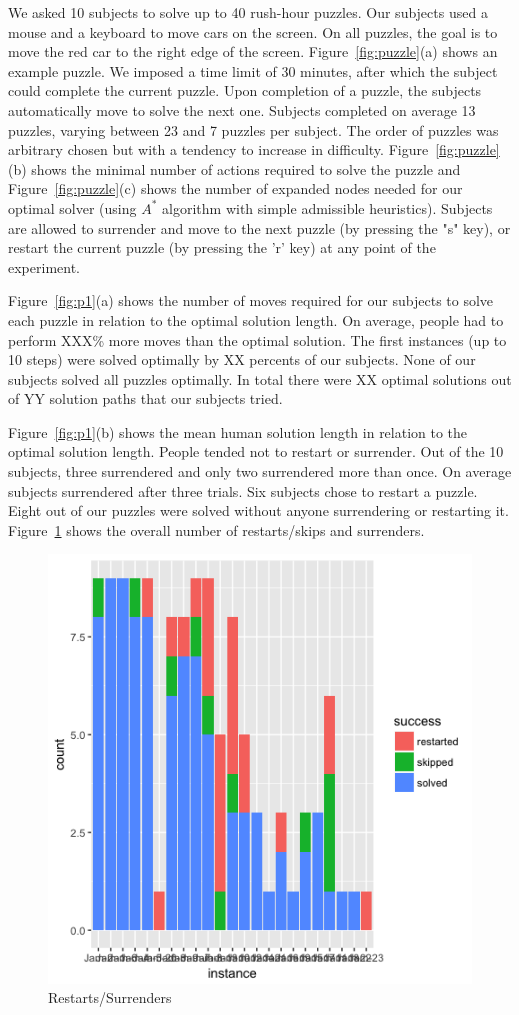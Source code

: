 \documentclass[10pt,letterpaper]{article}
\begin{document}
We asked 10 subjects to solve up to 40 rush-hour puzzles. Our subjects used a mouse and a keyboard to move cars on the screen. On all puzzles, the goal is to move the red car to the right edge of the screen. Figure~\ref{fig:puzzle}(a) shows an example puzzle.  We imposed a time limit of 30 minutes, after which the subject could complete the current puzzle.
Upon completion of a puzzle, the subjects automatically move to solve the next one. 
Subjects completed on average 13 puzzles, varying between 23 and 7 puzzles per subject. 
The order of puzzles was arbitrary chosen but with a tendency to increase in difficulty. Figure~\ref{fig:puzzle}(b) shows the  minimal number of actions required to solve the puzzle and Figure~\ref{fig:puzzle}(c) shows the number of expanded nodes needed for our optimal solver (using $A^*$ algorithm with simple admissible heuristics).  
Subjects are allowed to surrender and move to the next puzzle (by pressing the "s" key), or restart the current puzzle (by pressing the 'r' key) at any point of the experiment.

Figure~\ref{fig:p1}(a) shows the number of moves required for our subjects to solve each puzzle in relation to the optimal solution length. 
On average, people had to perform XXX\% more moves than the optimal solution. The first instances (up to 10 steps) were solved optimally by XX percents of our subjects. 
None of our subjects solved all puzzles optimally. In total there were XX optimal solutions out of YY solution paths that our subjects tried.

Figure~\ref{fig:p1}(b) shows the mean human solution length in relation to the optimal solution length.
People tended not to restart or surrender. Out of the 10 subjects, three surrendered and only two surrendered more than once. On average subjects surrendered after three trials. Six subjects chose to restart a puzzle. Eight out of our puzzles were solved without anyone surrendering or restarting it. Figure~\ref{fig:p7} shows the overall number of restarts/skips and surrenders.

\begin{figure}[!htb]
	\centering
	\includegraphics[width=0.5\linewidth]{p7}
	\caption{Restarts/Surrenders}
	\label{fig:p7}
\end{figure}
\end{document}

